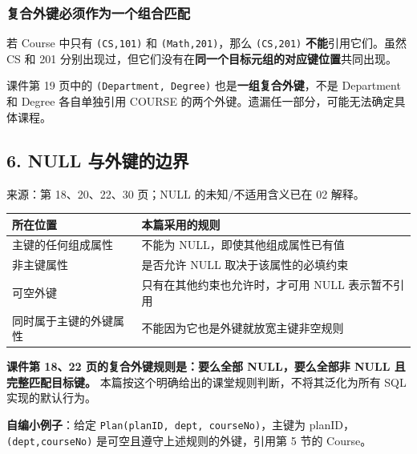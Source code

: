 \subsubsection{复合外键必须作为一个组合匹配}\label{03_relational_model_and_integrity_zh-ux590dux5408ux5916ux952eux5fc5ux987bux4f5cux4e3aux4e00ux4e2aux7ec4ux5408ux5339ux914d}

若 Course 中只有 \texttt{(\allowbreak{}CS,\allowbreak{}101)\allowbreak{}} 和 \texttt{(\allowbreak{}Math,\allowbreak{}201)\allowbreak{}}，那么 \texttt{(\allowbreak{}CS,\allowbreak{}201)\allowbreak{}} \textbf{不能}引用它们。虽然 CS 和 201 分别出现过，但它们没有在\textbf{同一个目标元组的对应键位置}共同出现。

课件第 19 页中的 \texttt{(\allowbreak{}Department,\allowbreak{}\ Degree)\allowbreak{}} 也是\textbf{一组复合外键}，不是 Department 和 Degree 各自单独引用 COURSE 的两个外键。遗漏任一部分，可能无法确定具体课程。

\subsection{6. NULL 与外键的边界}\label{03_relational_model_and_integrity_zh-null-ux4e0eux5916ux952eux7684ux8fb9ux754c}

来源：第 18、20、22、30 页；NULL 的未知/不适用含义已在 02 解释。

\begin{longtable}[]{@{}ll@{}}
\toprule\noalign{}
所在位置 & 本篇采用的规则 \\
\midrule\noalign{}
\endhead
\bottomrule\noalign{}
\endlastfoot
主键的任何组成属性 & 不能为 NULL，即使其他组成属性已有值 \\
非主键属性 & 是否允许 NULL 取决于该属性的必填约束 \\
可空外键 & 只有在其他约束也允许时，才可用 NULL 表示暂不引用 \\
同时属于主键的外键属性 & 不能因为它也是外键就放宽主键非空规则 \\
\end{longtable}

\textbf{课件第 18、22 页的复合外键规则是：要么全部 NULL，要么全部非 NULL 且完整匹配目标键。} 本篇按这个明确给出的课堂规则判断，不将其泛化为所有 SQL 实现的默认行为。

\textbf{自编小例子}：给定 \texttt{Plan(\allowbreak{}planID,\allowbreak{}\ dept,\allowbreak{}\ courseNo)\allowbreak{}}，主键为 planID，\texttt{(\allowbreak{}dept,\allowbreak{}courseNo)\allowbreak{}} 是可空且遵守上述规则的外键，引用第 5 节的 Course。

